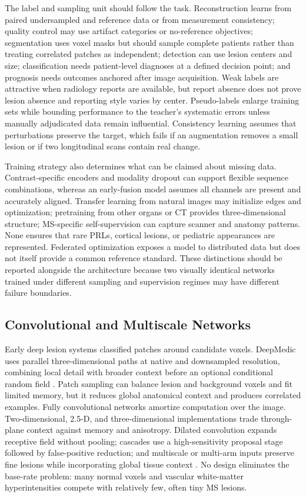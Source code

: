 \documentclass[journal,twoside,web]{ieeecolor}
\begin{document}
The label and sampling unit should follow the task. Reconstruction learns from paired undersampled and reference data or from measurement consistency; quality control may use artifact categories or no-reference objectives; segmentation uses voxel masks but should sample complete patients rather than treating correlated patches as independent; detection can use lesion centers and size; classification needs patient-level diagnoses at a defined decision point; and prognosis needs outcomes anchored after image acquisition. Weak labels are attractive when radiology reports are available, but report absence does not prove lesion absence and reporting style varies by center. Pseudo-labels enlarge training sets while bounding performance to the teacher's systematic errors unless manually adjudicated data remain influential. Consistency learning assumes that perturbations preserve the target, which fails if an augmentation removes a small lesion or if two longitudinal scans contain real change.


Training strategy also determines what can be claimed about missing data. Contrast-specific encoders and modality dropout can support flexible sequence combinations, whereas an early-fusion model assumes all channels are present and accurately aligned. Transfer learning from natural images may initialize edges and optimization; pretraining from other organs or CT provides three-dimensional structure; MS-specific self-supervision can capture scanner and anatomy patterns. None ensures that rare PRLs, cortical lesions, or pediatric appearances are represented. Federated optimization exposes a model to distributed data but does not itself provide a common reference standard. These distinctions should be reported alongside the architecture because two visually identical networks trained under different sampling and supervision regimes may have different failure boundaries.


\subsection{Convolutional and Multiscale Networks}\label{subsec:convolutional-and-multiscale-networks}

Early deep lesion systems classified patches around candidate voxels. DeepMedic uses parallel three-dimensional paths at native and downsampled resolution, combining local detail with broader context before an optional conditional random field \cite{deepmedic}. Patch sampling can balance lesion and background voxels and fit limited memory, but it reduces global anatomical context and produces correlated examples. Fully convolutional networks amortize computation over the image. Two-dimensional, 2.5-D, and three-dimensional implementations trade through-plane context against memory and anisotropy. Dilated convolution expands receptive field without pooling; cascades use a high-sensitivity proposal stage followed by false-positive reduction; and multiscale or multi-arm inputs preserve fine lesions while incorporating global tissue context \cite{gabr,mckinley,multiarm}. No design eliminates the base-rate problem: many normal voxels and vascular white-matter hyperintensities compete with relatively few, often tiny MS lesions.
\end{document}

